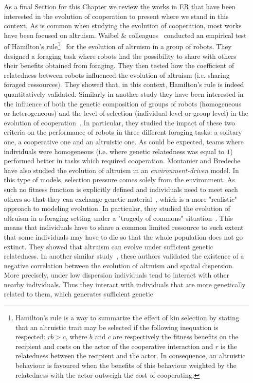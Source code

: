         As a final Section for this Chapter we review the works in ER that have been interested in the evolution of cooperation to present where we stand in this context. As is common when studying the evolution of cooperation, most works have been focused on altruism. Waibel \& colleagues~\parencite{Waibel2011} conducted an empirical test of Hamilton's rule\footnote{Hamilton's rule is a way to summarize the effect of kin selection by stating that an altruistic trait may be selected if the following inequation is respected: $rb > c$, where $b$ and $c$ are respectively the fitness benefits on the recipient and costs on the actor of the cooperative interaction and $r$ is the relatedness between the recipient and the actor. In consequence, an altruistic behaviour is favoured when the benefits of this behaviour weighted by the relatedness with the actor outweigh the cost of cooperating.}~\parencite{Hamilton1964} for the evolution of altruism in a group of robots. They designed a foraging task where robots had the possibility to share with others their benefits obtained from foraging. They then tested how the coefficient of relatedness between robots influenced the evolution of altruism (i.e. sharing foraged ressources). They showed that, in this context, Hamilton's rule is indeed quantitatively validated. Similarly in another study they have been interested in the influence of both the genetic composition of groups of robots (homogeneous or heterogeneous) and the level of selection (individual-level or group-level) in the evolution of cooperation~\parencite{Waibel2009}. In particular, they studied the impact of these two criteria on the performance of robots in three different foraging tasks: a solitary one, a cooperative one and an altruistic one. As could be expected, teams where individuals were homogeneous (i.e. where genetic relatedness was equal to $1$) performed better in tasks which required cooperation. Montanier and Bredeche have also studied the evolution of altruism in an \emph{environment-driven} model. In this type of models, selection pressure comes solely from the environment. As such no fitness function is explicitly defined and individuals need to meet each others so that they can exchange genetic material~\parencite{Bredeche2010}, which is a more "realistic" approach to modeling evolution. In particular, they studied the evolution of altruism in a foraging setting under a "tragedy of commons" situation~\parencite{Hardin1968, Montanier2011}. This means that individuals have to share a common limited ressource to such extent that some individuals may have to die so that the whole population does not go extinct. They showed that altruism can evolve under sufficient genetic relatedness. In another similar study~\parencite{Montanier2013}, these authors validated the existence of a negative correlation between the evolution of altruism and spatial dispersion. More precisely, under low dispersion individuals tend to interact with other nearby individuals. Thus they interact with individuals that are more genetically related to them, which generates sufficient genetic 